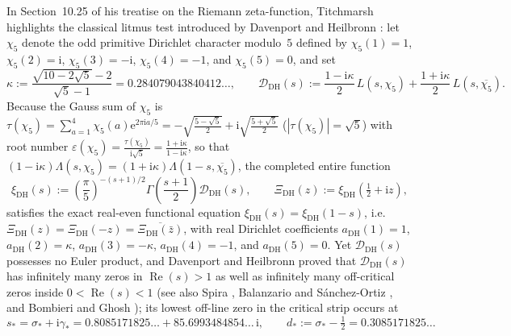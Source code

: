 \documentclass[11pt,reqno]{amsart}
\theoremstyle{definition}
\theoremstyle{remark}
\numberwithin{equation}{section}
\newcommand{\ii}{\mathrm{i}}
\newcommand{\ee}{\mathrm{e}}
\DeclareMathOperator{\Reop}{Re}
\begin{document}
In Section~10.25 of his treatise on the Riemann zeta-function, Titchmarsh \cite{titchmarsh1986} highlights the classical litmus test introduced by Davenport and Heilbronn \cite{davenport1936}: let $\chi_5$ denote the odd primitive Dirichlet character modulo~$5$ defined by $\chi_5(1)=1$, $\chi_5(2)=\ii$, $\chi_5(3)=-\ii$, $\chi_5(4)=-1$, and $\chi_5(5)=0$, and set
\begin{equation}
  \kappa := \frac{\sqrt{10 - 2\sqrt{5}} - 2}{\sqrt{5} - 1} = 0.284079043840412\ldots,
  \qquad
  \mathcal{D}_{\mathrm{DH}}(s) := \frac{1 - \ii\kappa}{2}\,L(s, \chi_5) + \frac{1 + \ii\kappa}{2}\,L(s, \overline{\chi_5}).
  \label{eq:dh-def}
\end{equation}
Because the Gauss sum of $\chi_5$ is $\tau(\chi_5) = \sum_{a=1}^{4}\chi_5(a)\ee^{2\pi\ii a/5} = -\sqrt{\frac{5 - \sqrt{5}}{2}} + \ii\sqrt{\frac{5 + \sqrt{5}}{2}}$ ($|\tau(\chi_5)| = \sqrt{5}$) with root number $\varepsilon(\chi_5) = \frac{\tau(\chi_5)}{\ii\sqrt{5}} = \frac{1 + \ii\kappa}{1 - \ii\kappa}$, so that $(1 - \ii\kappa)\Lambda(s,\chi_5) = (1 + \ii\kappa)\Lambda(1-s,\overline{\chi_5})$, the completed entire function
\begin{equation}
  \xi_{\mathrm{DH}}(s) := \left(\frac{\pi}{5}\right)^{-(s+1)/2} \Gamma\!\left(\frac{s+1}{2}\right) \mathcal{D}_{\mathrm{DH}}(s),
  \qquad
  \Xi_{\mathrm{DH}}(z) := \xi_{\mathrm{DH}}\!\left(\tfrac{1}{2} + \ii z\right),
  \label{eq:xi-dh-def}
\end{equation}
satisfies the exact real-even functional equation $\xi_{\mathrm{DH}}(s) = \xi_{\mathrm{DH}}(1 - s)$, i.e.\ $\Xi_{\mathrm{DH}}(z) = \Xi_{\mathrm{DH}}(-z) = \overline{\Xi_{\mathrm{DH}}(\bar{z})}$, with real Dirichlet coefficients $a_{\mathrm{DH}}(1)=1$, $a_{\mathrm{DH}}(2)=\kappa$, $a_{\mathrm{DH}}(3)=-\kappa$, $a_{\mathrm{DH}}(4)=-1$, and $a_{\mathrm{DH}}(5)=0$. Yet $\mathcal{D}_{\mathrm{DH}}(s)$ possesses no Euler product, and Davenport and Heilbronn proved that $\mathcal{D}_{\mathrm{DH}}(s)$ has infinitely many zeros in $\Reop(s) > 1$ as well as infinitely many off-critical zeros inside $0 < \Reop(s) < 1$ (see also Spira \cite{spira1994}, Balanzario and S\'anchez-Ortiz \cite{balanzario2007}, and Bombieri and Ghosh \cite{bombieri2011}); its lowest off-line zero in the critical strip occurs at
\begin{equation}
  s_* = \sigma_* + \ii\gamma_* = 0.8085171825\ldots + 85.6993484854\ldots\,\ii,
  \qquad
  d_* := \sigma_* - \tfrac{1}{2} = 0.3085171825\ldots
  \label{eq:dh-first-zero}
\end{equation}
\end{document}
